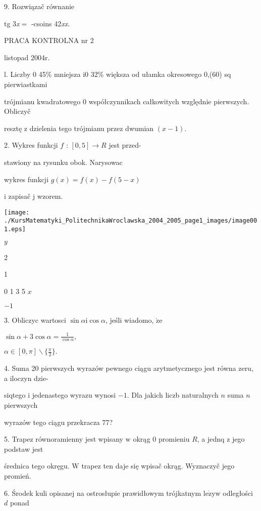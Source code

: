 \documentclass[a4paper,12pt]{article}
\begin{document}
9. Rozwiązač równanie

tg 3{\it x}$=$ -csoins 42{\it xx}.




PRACA KONTROLNA nr 2

listopad 2004r.

l. Liczby $0$ 45\% mniejsza $\mathrm{i} 0$ 32\% większa od ułamka okresowego 0,(60) sq pierwiastkami

trójmianu kwadratowego $0$ współczynnikach całkowitych względnie pierwszych. Obliczyč

resztę $\mathrm{z}$ dzielenia tego trójmianu przez dwumian $(x-1).$

2. Wykres funkcji $f$ : $[0,5]\rightarrow R$ jest przed-

stawiony na rysunku obok. Narysowac

wykres funkcji $g(x)=f(x)-f(5-x)$

$\mathrm{i}$ zapisač $\mathrm{j}$ wzorem.
\begin{center}
\texttt{[image: ./KursMatematyki\_PolitechnikaWroclawska\_2004\_2005\_page1\_images/image001.eps]}
\end{center}
$y$

2

1

0 1 3 5 $x$

$-1$

3. Obliczyc wartosci $\sin\alpha \mathrm{i}\cos\alpha$, jeśli wiadomo, $\dot{\mathrm{z}}\mathrm{e}$

$\displaystyle \sin\alpha+3\cos\alpha=\frac{1}{\cos\alpha},$

$\displaystyle \alpha\in[0,\pi]\backslash \{\frac{\pi}{2}\}.$

4. Suma 20 pierwszych wyrazów pewnego ciągu arytmetycznego jest równa zeru, a iloczyn dzie-

siqtego $\mathrm{i}$ jedenastego wyrazu wynosi $-1$. Dla jakich liczb naturalnych $n$ suma $n$ pierwszych

wyrazów tego ciągu przekracza 77?

5. Trapez równoramienny jest wpisany $\mathrm{w}$ okrąg $0$ promieniu $R$, a jednq $\mathrm{z}$ jego podstaw jest

średnica tego okręgu. $\mathrm{W}$ trapez ten daje się wpisač okrąg. Wyznaczyč jego promień.

6. Środek kuli opisanej na ostrosłupie prawidłowym trójkatnym $\mathrm{l}\mathrm{e}\dot{\mathrm{z}}\mathrm{y}\mathrm{w}$ odległości $d$ ponad
\end{document}
